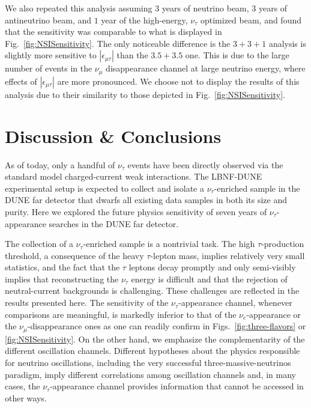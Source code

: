 \documentclass[aps,prd,onecolumn,nofootinbib,superscriptaddress, 11pt]{revtex4}
\begin{document}
We also repeated this analysis assuming $3$ years of neutrino beam, $3$ years of antineutrino beam, and $1$ year of the high-energy, $\nu_\tau$ optimized beam, and found that the sensitivity was comparable to what is displayed in Fig.~\ref{fig:NSISensitivity}. The only noticeable difference is the $3+3+1$ analysis is slightly more sensitive to $|\epsilon_{\mu\tau}|$ than the $3.5+3.5$ one. This is due to the large number of events in the $\nu_\mu$ disappearance channel at large neutrino energy, where effects of $|\epsilon_{\mu\tau}|$ are more pronounced. We choose not to display the results of this analysis due to their similarity to those depicted in Fig.~\ref{fig:NSISensitivity}.



\setcounter{equation}{0}
\section{Discussion \& Conclusions}
\label{sec:conclusion}

As of today, only a handful of $\nu_{\tau}$ events have been directly observed via the standard model charged-current weak interactions. The LBNF-DUNE experimental setup is expected to collect and isolate a  $\nu_{\tau}$-enriched sample in the DUNE far detector that dwarfs all existing data samples in both its size and purity. Here we explored the future physics sensitivity of seven years of $\nu_{\tau}$-appearance searches in the DUNE far detector. 

The collection of a $\nu_{\tau}$-enriched sample is a nontrivial task. The high $\tau$-production threshold, a consequence of the heavy $\tau$-lepton mass,  implies relatively very small statistics, and the fact that the $\tau$ leptons decay promptly and only semi-visibly implies that reconstructing the $\nu_{\tau}$ energy is difficult and that the rejection of neutral-current backgrounds is challenging. These challenges are reflected in the results presented here. The sensitivity of the $\nu_{\tau}$-appearance channel, whenever comparisons are meaningful, is markedly inferior to that of the $\nu_{e}$-appearance or the $\nu_{\mu}$-disappearance ones as one can readily confirm in Figs.~\ref{fig:three-flavors} or \ref{fig:NSISensitivity}. On the other hand, we emphasize the complementarity of the different oscillation channels. Different hypotheses about the physics responsible for neutrino oscillations, including the very successful three-massive-neutrinos paradigm, imply different correlations among oscillation channels and, in many cases, the $\nu_{\tau}$-appearance channel provides information that cannot be accessed in other ways. 
\end{document}

